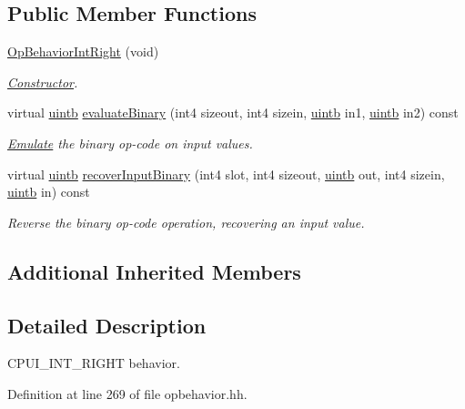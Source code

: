 \subsection*{Public Member Functions}
\begin{DoxyCompactItemize}
\item 
\mbox{\hyperlink{class_op_behavior_int_right_a353091e1e88dcba748526a4f96fad418}{Op\+Behavior\+Int\+Right}} (void)
\begin{DoxyCompactList}\small\item\em \mbox{\hyperlink{class_constructor}{Constructor}}. \end{DoxyCompactList}\item 
virtual \mbox{\hyperlink{types_8h_a2db313c5d32a12b01d26ac9b3bca178f}{uintb}} \mbox{\hyperlink{class_op_behavior_int_right_a9d85dc8a305522589e394b4b14ff8caa}{evaluate\+Binary}} (int4 sizeout, int4 sizein, \mbox{\hyperlink{types_8h_a2db313c5d32a12b01d26ac9b3bca178f}{uintb}} in1, \mbox{\hyperlink{types_8h_a2db313c5d32a12b01d26ac9b3bca178f}{uintb}} in2) const
\begin{DoxyCompactList}\small\item\em \mbox{\hyperlink{class_emulate}{Emulate}} the binary op-\/code on input values. \end{DoxyCompactList}\item 
virtual \mbox{\hyperlink{types_8h_a2db313c5d32a12b01d26ac9b3bca178f}{uintb}} \mbox{\hyperlink{class_op_behavior_int_right_a8ee48eb765dc6c9427c0f10aceee4fe8}{recover\+Input\+Binary}} (int4 slot, int4 sizeout, \mbox{\hyperlink{types_8h_a2db313c5d32a12b01d26ac9b3bca178f}{uintb}} out, int4 sizein, \mbox{\hyperlink{types_8h_a2db313c5d32a12b01d26ac9b3bca178f}{uintb}} in) const
\begin{DoxyCompactList}\small\item\em Reverse the binary op-\/code operation, recovering an input value. \end{DoxyCompactList}\end{DoxyCompactItemize}
\subsection*{Additional Inherited Members}


\subsection{Detailed Description}
C\+P\+U\+I\+\_\+\+I\+N\+T\+\_\+\+R\+I\+G\+HT behavior. 

Definition at line 269 of file opbehavior.\+hh.



